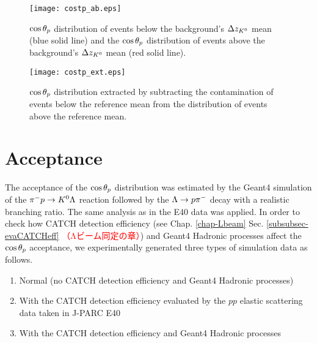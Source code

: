 \begin{figure}[h]
  \centering
  \texttt{[image: costp\_ab.eps]}
  \caption{$\cos{\theta_p}$ distribution of events below the background's $\Delta z_{K^{0}}$ mean (blue solid line) and the $\cos{\theta_p}$ distribution of events above the background's $\Delta z_{K^{0}}$ mean (red solid line).}
  \label{fig-costp_ab}
\end{figure}

\begin{figure}[h]
  \centering
  \texttt{[image: costp\_ext.eps]}
  \caption{$\cos{\theta_p}$ distribution extracted by subtracting the contamination of events below the reference mean from the distribution of events above the reference mean.}
  \label{fig-costp_ext}
\end{figure}


\clearpage
\section{Acceptance}
\label{sec-accPl}

The acceptance of the $\cos{\theta_p}$ distribution was estimated by the Geant4 simulation of the $\pi^- p \to K^0 \Lambda$ reaction followed by the $\Lambda\to p\pi^{-}$ decay with a realistic branching ratio. The same analysis as in the E40 data was applied. In order to check how CATCH detection efficiency (see Chap. \ref{chap-Lbeam} Sec. \ref{subsubsec-evaCATCHeff} \textcolor{red}{（Λビーム同定の章）}) and Geant4 Hadronic processes affect the $\cos{\theta_p}$ acceptance, we experimentally generated three types of simulation data as follows.
\begin{enumerate}
  \item Normal (no CATCH detection efficiency and Geant4 Hadronic processes)
  \item With the CATCH detection efficiency evaluated by the $pp$ elastic scattering data taken in J-PARC E40
  \item With the CATCH detection efficiency and Geant4 Hadronic processes
  \label{list-threetypes}
\end{enumerate}



